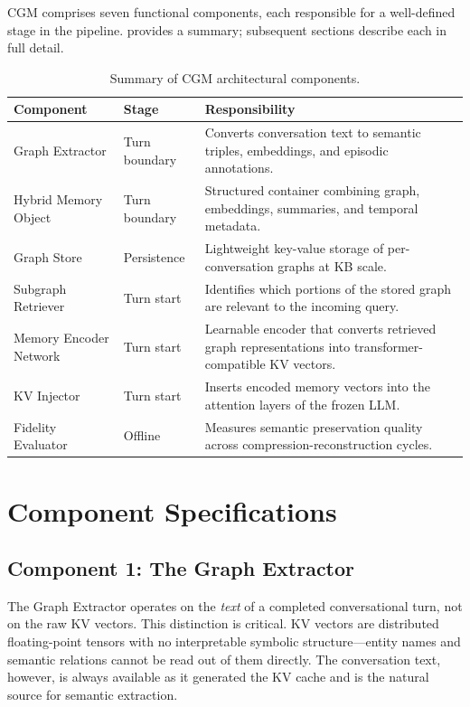 \documentclass[11pt, a4paper, twoside]{article}
\theoremstyle{definition}
\newcommand{\CGM}{\textsc{CGM}\xspace}
\begin{document}
\CGM comprises seven functional components, each responsible for a well-defined
stage in the pipeline.  provides a summary; subsequent
sections describe each in full detail.

\begin{table}[H]
\centering
\caption{Summary of \CGM architectural components.}
\label{tab:components}
\begin{tabularx}{\textwidth}{@{}llX@{}}
\toprule
\textbf{Component} & \textbf{Stage} & \textbf{Responsibility} \\
\midrule
Graph Extractor & Turn boundary & Converts conversation text to semantic triples,
  embeddings, and episodic annotations. \\
Hybrid Memory Object & Turn boundary & Structured container combining graph,
  embeddings, summaries, and temporal metadata. \\
Graph Store & Persistence & Lightweight key-value storage of per-conversation
  graphs at KB scale. \\
Subgraph Retriever & Turn start & Identifies which portions of the stored graph
  are relevant to the incoming query. \\
Memory Encoder Network & Turn start & Learnable encoder that converts retrieved
  graph representations into transformer-compatible KV vectors. \\
KV Injector & Turn start & Inserts encoded memory vectors into the attention
  layers of the frozen LLM. \\
Fidelity Evaluator & Offline & Measures semantic preservation quality across
  compression-reconstruction cycles. \\
\bottomrule
\end{tabularx}
\end{table}

\section{Component Specifications}
\label{sec:components}

\subsection{Component 1: The Graph Extractor}
\label{sec:extractor}

The Graph Extractor operates on the \textit{text} of a completed conversational turn,
not on the raw KV vectors. This distinction is critical. KV vectors are distributed
floating-point tensors with no interpretable symbolic structure---entity names and
semantic relations cannot be read out of them directly. The conversation text, however,
is always available as it generated the KV cache and is the natural source for semantic
extraction.
\end{document}
